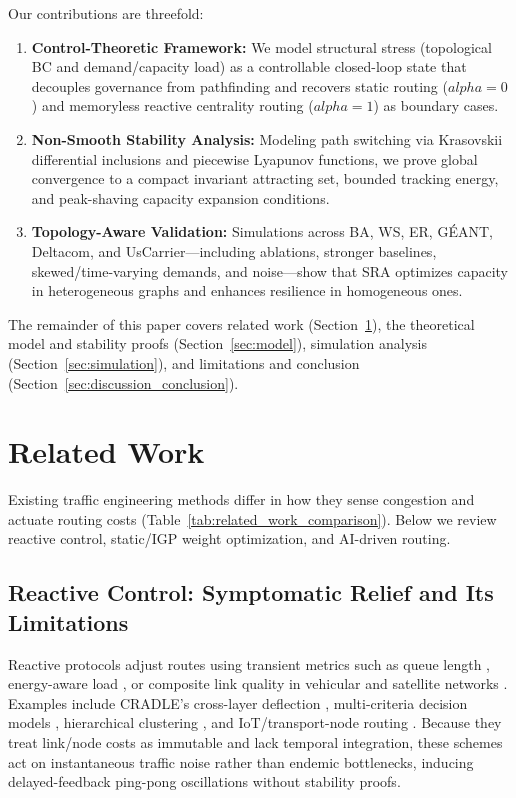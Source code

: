 \documentclass{ccjnl}
\newcommand{\rev}[1]{#1}
\def\rev#1{#1}%
\def\alpha{alpha}%
\begin{document}
Our contributions are threefold:
\begin{enumerate}
    \item \textbf{Control-Theoretic Framework:} We model structural stress \rev{(topological BC and demand/capacity load)} as a controllable closed-loop state that decouples governance from pathfinding and recovers static routing \rev{($\alpha=0$) and memoryless reactive centrality routing ($\alpha=1$)} as boundary cases.
    \item \textbf{Non-Smooth Stability Analysis:} Modeling path switching via Krasovskii differential inclusions and piecewise Lyapunov functions, we prove \rev{global convergence to a compact invariant attracting set, bounded tracking energy, and peak-shaving capacity expansion conditions}.
    \item \textbf{Topology-Aware \rev{Validation}:} Simulations \rev{across BA, WS, ER, G\'EANT, Deltacom, and UsCarrier---including ablations, stronger baselines, skewed/time-varying demands, and noise---}show that SRA optimizes capacity in heterogeneous graphs and enhances resilience in homogeneous ones.
\end{enumerate}

The remainder of this paper covers related work (Section~\ref{sec:related_work}), the theoretical model and stability proofs (Section~\ref{sec:model}), simulation analysis (Section~\ref{sec:simulation}), and limitations and conclusion (Section~\ref{sec:discussion_conclusion}).




\section{Related Work}
\label{sec:related_work}

Existing traffic engineering methods differ in how they sense congestion and actuate routing costs (Table~\ref{tab:related_work_comparison}). Below we review reactive control, static/IGP weight optimization, and AI-driven routing.

\subsection{Reactive Control: Symptomatic Relief and Its Limitations}

Reactive protocols adjust routes using transient metrics such as queue length \cite{Macabale2020Cradle}, energy-aware load \cite{SM2025Novel}, or composite link quality in vehicular and satellite networks \cite{Wang2025VANET, Fu2024SatelliteBC,wang2022cdmr}. Examples include CRADLE's cross-layer deflection \cite{Macabale2020Cradle}, multi-criteria decision models \cite{Fouad2014MultiCriteria}, hierarchical clustering \cite{Guizani2011Hierarchical}, and IoT/transport-node routing \cite{Darabkh2025SmartCity, Aditya2020ClosenessCluster, Wu2024RailwayNode,ma2022traffic}. Because they treat link/node costs as immutable and lack temporal integration, these schemes act on instantaneous traffic noise rather than endemic bottlenecks, inducing delayed-feedback ping-pong oscillations without stability proofs.
\end{document}
